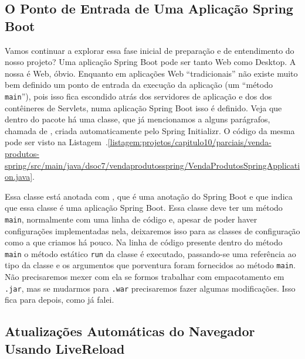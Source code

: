 \subsection{O Ponto de Entrada de Uma Aplicação Spring Boot}

Vamos continuar a explorar essa fase inicial de preparação e de entendimento do nosso projeto? Uma aplicação Spring Boot pode ser tanto Web como Desktop. A nossa é Web, óbvio. Enquanto em aplicações Web ``tradicionais'' não existe muito bem definido um ponto de entrada da execução da aplicação (um ``método \texttt{main}''), pois isso fica escondido atrás dos servidores de aplicação e dos dos contêineres de Servlets, numa aplicação Spring Boot isso é definido. Veja que dentro do pacote  há uma classe, que já mencionamos a alguns parágrafos, chamada de , criada automaticamente pelo Spring Initializr. O código da mesma pode ser visto na Listagem~\thechapter.\ref{listagem:projetos/capitulo10/parciais/venda-produtos-spring/src/main/java/dsoc7/vendaprodutosspring/VendaProdutosSpringApplication.java}.


Essa classe está anotada com , que é uma anotação do Spring Boot e que indica que essa classe é uma aplicação Spring Boot. Essa classe deve ter um método \texttt{main}, normalmente com uma linha de código e, apesar de poder haver configurações implementadas nela, deixaremos isso para as classes de configuração como a  que criamos há pouco. Na linha de código presente dentro do método \texttt{main} o método estático \texttt{run} da classe  é executado, passando-se uma referência ao tipo da classe  e os argumentos que porventura foram fornecidos ao método \texttt{main}. Não precisaremos mexer com ela se formos trabalhar com empacotamento em \texttt{.jar}, mas se mudarmos para \texttt{.war} precisaremos fazer algumas modificações. Isso fica para depois, como já falei.


\subsection{Atualizações Automáticas do Navegador Usando LiveReload}

